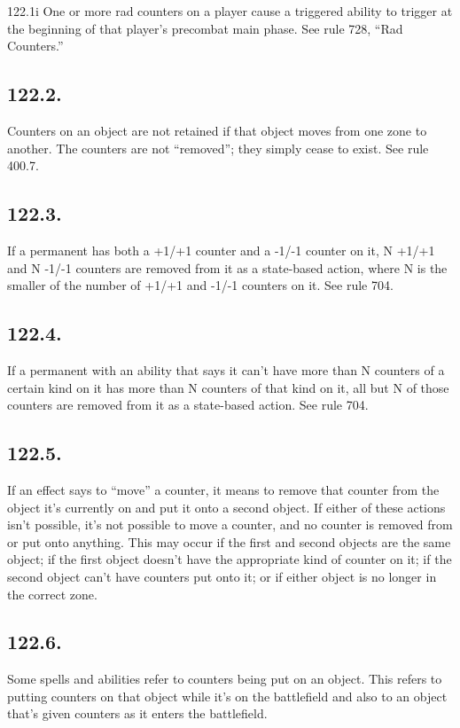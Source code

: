 122.1i One or more rad counters on a player cause a triggered ability to trigger at the beginning of that player’s precombat main phase. See rule 728, “Rad Counters.”

\subsection*{122.2.}
Counters on an object are not retained if that object moves from one zone to another. The counters are not “removed”; they simply cease to exist. See rule 400.7.

\subsection*{122.3.}
If a permanent has both a +1/+1 counter and a -1/-1 counter on it, N +1/+1 and N -1/-1 counters are removed from it as a state-based action, where N is the smaller of the number of +1/+1 and -1/-1 counters on it. See rule 704.

\subsection*{122.4.}
If a permanent with an ability that says it can’t have more than N counters of a certain kind on it has more than N counters of that kind on it, all but N of those counters are removed from it as a state-based action. See rule 704.

\subsection*{122.5.}
If an effect says to “move” a counter, it means to remove that counter from the object it’s currently on and put it onto a second object. If either of these actions isn’t possible, it’s not possible to move a counter, and no counter is removed from or put onto anything. This may occur if the first and second objects are the same object; if the first object doesn’t have the appropriate kind of counter on it; if the second object can’t have counters put onto it; or if either object is no longer in the correct zone.

\subsection*{122.6.}
Some spells and abilities refer to counters being put on an object. This refers to putting counters on that object while it’s on the battlefield and also to an object that’s given counters as it enters the battlefield.

